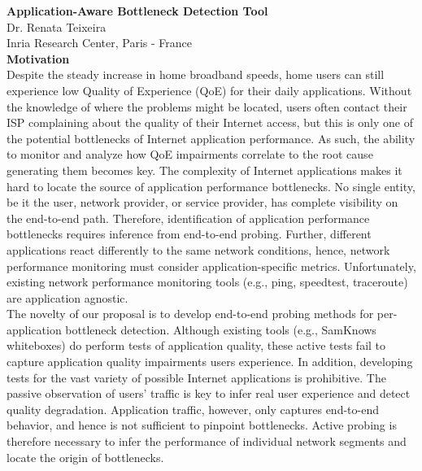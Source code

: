 \documentclass[11 pt]{article}
\begin{document}

\noindent \textbf{Application-Aware Bottleneck Detection Tool}\\
Dr. Renata Teixeira \\
Inria Research Center, Paris - France\\

\noindent \textbf{Motivation}\\

Despite the steady increase in home broadband speeds, home users can still experience low Quality of Experience (QoE) for their daily applications. Without the knowledge of where the problems might be located, users often contact their ISP complaining about the quality of their Internet access, but this is only one of the potential bottlenecks of Internet application performance. As such, the ability to monitor and analyze how QoE impairments correlate to the root cause generating them becomes key. The complexity of Internet applications makes it hard to locate the source of application performance bottlenecks. No single entity, be it the user, network provider, or service provider, has complete visibility on the end-to-end path. Therefore, identification of application performance bottlenecks requires inference from end-to-end probing. Further, different applications react differently to the same network conditions, hence, network performance monitoring must consider application-specific metrics. Unfortunately, existing network performance monitoring tools (e.g., ping, speedtest, traceroute) are application agnostic.\\

The novelty of our proposal is to develop end-to-end probing methods for per-application bottleneck detection. Although existing tools (e.g., SamKnows whiteboxes) do perform tests of application quality, these active tests fail to capture application quality impairments users experience. In addition, developing tests for the vast variety of possible Internet applications is prohibitive. The passive observation of users' traffic is key to infer real user experience and detect quality degradation. Application traffic, however, only captures end-to-end behavior, and hence is not sufficient to pinpoint bottlenecks. Active probing is therefore necessary to infer the performance of individual network segments and locate the origin of bottlenecks.\\
\end{document}

